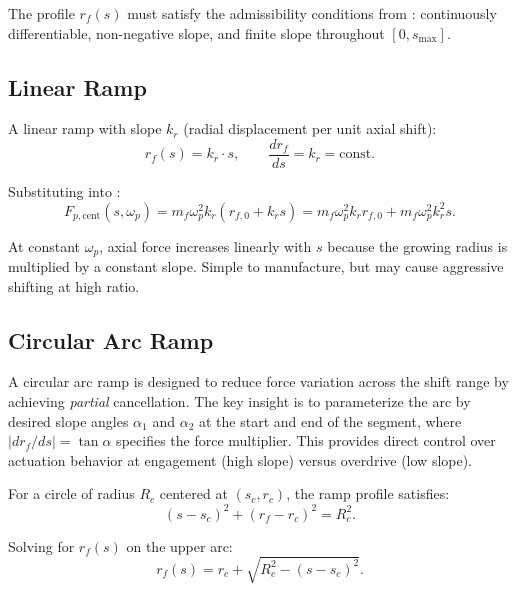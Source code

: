 \documentclass[11pt]{article}
\numberwithin{equation}{section}
\begin{document}
The profile $r_f(s)$ must satisfy the admissibility conditions from
: continuously differentiable, non-negative slope,
and finite slope throughout $[0, s_{\max}]$.

\subsection{Linear Ramp}
\label{sec:ramp_linear}

A linear ramp with slope $k_r$ (radial displacement per unit axial shift):
\begin{equation}
r_f(s) = k_r \cdot s,
\qquad
\frac{dr_f}{ds} = k_r = \text{const}.
\label{eq:linear_ramp}
\end{equation}

Substituting into :
\begin{equation}
F_{p,\mathrm{cent}}(s,\omega_p)
= m_f \omega_p^2 k_r (r_{f,0} + k_r s)
= m_f \omega_p^2 k_r r_{f,0} + m_f \omega_p^2 k_r^2 s.
\label{eq:linear_ramp_force}
\end{equation}

At constant $\omega_p$, axial force increases linearly with $s$ because
the growing radius is multiplied by a constant slope. Simple to manufacture,
but may cause aggressive shifting at high ratio.

\subsection{Circular Arc Ramp}
\label{sec:ramp_circular}

A circular arc ramp is designed to reduce force variation across the shift
range by achieving \emph{partial} cancellation. The key insight is to parameterize
the arc by desired slope angles $\alpha_1$ and $\alpha_2$ at the start and end
of the segment, where $|dr_f/ds| = \tan\alpha$ specifies the force multiplier.
This provides direct control over actuation behavior at engagement (high slope)
versus overdrive (low slope).

For a circle of radius $R_c$ centered at $(s_c, r_c)$, the ramp profile
satisfies:
\begin{equation}
(s - s_c)^2 + (r_f - r_c)^2 = R_c^2.
\end{equation}

Solving for $r_f(s)$ on the upper arc:
\begin{equation}
r_f(s) = r_c + \sqrt{R_c^2 - (s - s_c)^2}.
\label{eq:circ_ramp}
\end{equation}
\end{document}
